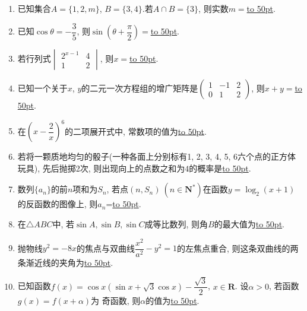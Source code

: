 \documentclass[10pt,a4paper]{article}
\newcommand{\blank}[1]{\underline{\hbox to #1pt{}}}
\begin{document}
\begin{enumerate}[1.]
\item 已知集合$A=\{1,2,m\}$, $B=\{3,4\}$.若$A\cap B=\{3\}$, 则实数$m=$\blank{50}.
\item 已知$\cos\theta=-\dfrac35$, 则$\sin(\theta+\dfrac{\pi}2)=$\blank{50}.
\item 若行列式$\begin{vmatrix} 2^{x-1} & 4  \\ 1 & 2 \end{vmatrix}$, 则$x=$\blank{50}.
\item 已知一个关于$x$, $y$的二元一次方程组的增广矩阵是$\begin{pmatrix} 1 & -1 & 2 \\ 0 & 1 & 2 \end{pmatrix}$, 则$x+y=$\blank{50}.
\item 在$(x-\dfrac2x)^6$的二项展开式中, 常数项的值为\blank{50}. 
\item 若将一颗质地均匀的骰子(一种各面上分别标有1, 2, 3, 4, 5, 6六个点的正方体玩具), 先后抛掷2次, 则出现向上的点数之和为$4$的概率是\blank{50}.
\item 数列$\{a_n\}$的前$n$项和为$S_n$, 若点$(n,S_n) \ (n\in \mathbf{N}^*)$在函数$y=\log_2 (x+1)$的反函数的图像上, 则$a_n$=\blank{50}.  
\item 在$\triangle ABC$中, 若$\sin A,\sin B,\sin C$成等比数列, 则角$B$的最大值为\blank{50}. 
\item 抛物线$y^2=-8x$的焦点与双曲线$\dfrac{x^2}{a^2}-y^2=1$的左焦点重合, 则这条双曲线的两条渐近线的夹角为\blank{50}.
\item 已知函数$f(x)=\cos x(\sin x+\sqrt3\cos x)-\dfrac{\sqrt3}2$, $x\in \mathbf{R}$. 设$\alpha>0$, 若函数$g(x)=f(x+\alpha)$为 奇函数, 则$\alpha$的值为\blank{50}.



\end{enumerate}
\end{document}
